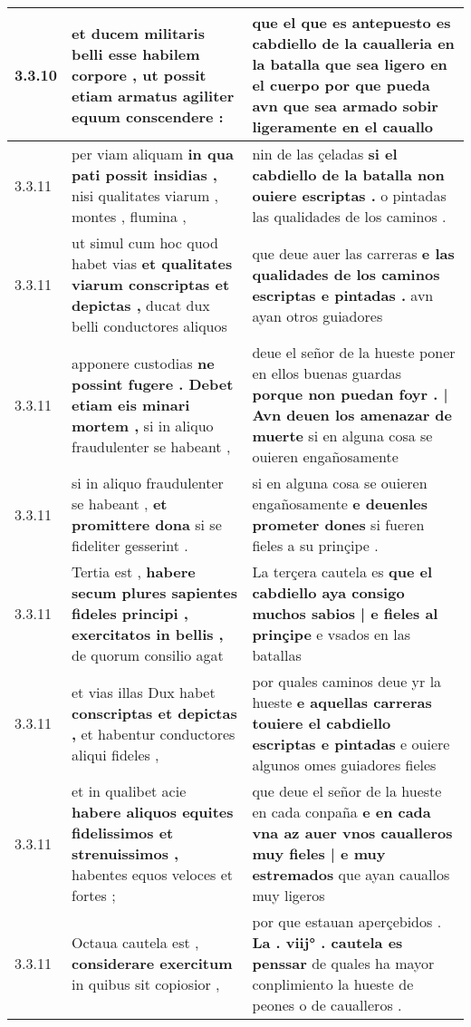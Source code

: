 \begin{tabular}{|p{1cm}|p{6.5cm}|p{6.5cm}|}
3.3.10 & et ducem militaris belli \textbf{ esse habilem corpore , } ut possit etiam armatus agiliter equum conscendere : & que el que es antepuesto es cabdiello de la caualleria en la batalla \textbf{ que sea ligero en el cuerpo } por que pueda avn que sea armado sobir ligeramente en el cauallo \\\hline
3.3.11 & per viam aliquam \textbf{ in qua pati possit insidias , } nisi qualitates viarum , montes , flumina , & nin de las çeladas \textbf{ si el cabdiello de la batalla non ouiere escriptas . } o pintadas las qualidades de los caminos . \\\hline
3.3.11 & ut simul cum hoc quod habet vias \textbf{ et qualitates viarum conscriptas et depictas , } ducat dux belli conductores aliquos & que deue auer las carreras \textbf{ e las qualidades de los caminos escriptas e pintadas . } avn ayan otros guiadores \\\hline
3.3.11 & apponere custodias \textbf{ ne possint fugere . Debet etiam eis minari mortem , } si in aliquo fraudulenter se habeant , & deue el señor de la hueste poner en ellos buenas guardas \textbf{ porque non puedan foyr . | Avn deuen los amenazar de muerte } si en alguna cosa se ouieren engañosamente \\\hline
3.3.11 & si in aliquo fraudulenter se habeant , \textbf{ et promittere dona } si se fideliter gesserint . & si en alguna cosa se ouieren engañosamente \textbf{ e deuenles prometer dones } si fueren fieles a su prinçipe . \\\hline
3.3.11 & Tertia est , \textbf{ habere secum plures sapientes fideles principi , exercitatos in bellis , } de quorum consilio agat & La terçera cautela es \textbf{ que el cabdiello aya consigo muchos sabios | e fieles al prinçipe } e vsados en las batallas \\\hline
3.3.11 & et vias illas Dux habet \textbf{ conscriptas et depictas , } et habentur conductores aliqui fideles , & por quales caminos deue yr la hueste \textbf{ e aquellas carreras touiere el cabdiello escriptas e pintadas } e ouiere algunos omes guiadores fieles \\\hline
3.3.11 & et in qualibet acie \textbf{ habere aliquos equites fidelissimos et strenuissimos , } habentes equos veloces et fortes ; & que deue el señor de la hueste en cada conpaña \textbf{ e en cada vna az auer vnos caualleros muy fieles | e muy estremados } que ayan cauallos muy ligeros \\\hline
3.3.11 & Octaua cautela est , \textbf{ considerare exercitum } in quibus sit copiosior , & por que estauan aperçebidos . \textbf{ La . viij° . cautela es penssar } de quales ha mayor conplimiento la hueste de peones o de caualleros . \\\hline

\end{tabular}
